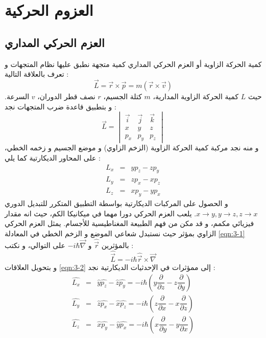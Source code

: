 \chapter{العزوم الحركية}
\label{Chapter3}
\section{العزم الحركي المداري}
كمية الحركة  الزاوية أو العزم الحركي المداري كمية متجهة نطبق عليها نظام المتجهات و تعرف بالعلاقة التالية :
\begin{equation}
	\label{eqn:3-1}
	\vec{L} = \vec{r} \times \vec{p} =m(\vec{r} \times \vec{v})
\end{equation} 
حيث $L$ كمية الحركة الزاوية المدارية، $m$ كتلة الجسيم، $r$ نصف قطر الدوران، $v$ السرعة. و بتطبيق قاعدة ضرب المتجهات نجد : 
\[\vec{L}=
\begin{vmatrix}
	\vec{i} & \vec{j} & \vec{k}\\ 
	x & y & z\\
	p_{x} & p_{y} & p_{z} 
\end{vmatrix}
\]
و منه نجد مركبة كمية الحركة الزاوية (الزخم الزاوي) و موضع الجسيم و زخمه الخطي، على المحاور الديكارتية كما يلي :
\begin{equation}
	\label{eqn:3-2}
	\begin{array}{ccl}
	L_{x} & = &  yp_{z} - zp_{y} \\
	L_{y} & = & zp_{x} - xp_{z} \\
	L_{z} & = & xp_{y} - yp_{x}
	\end{array}
\end{equation} 
و الحصول على المركبات الديكارتية بواسطة التطبيق المتكرر للتبديل الدوري $x \longrightarrow y, y \longrightarrow z, z \longrightarrow x$. يلعب العزم الحركي دورا مهما في ميكانيكا الكم، حيث انه مقدار فيزيائي مكمم، و قد مكن من فهم الطبيعة المغناطيسية للأجسام. يمثل العزم الحركي الزاوي بمؤثر  حيث نستبدل شعاعي الموضع و الزخم الخطي  في المعادلة \eqref{eqn:3-1} بالمؤثرين $\hat{\vec{r}}$  و $ -i\hbar \vec{\nabla}$ على التوالي، و نكتب :
\begin{equation}
\hat{\vec{L}}	= -i\hbar \hat{\vec{r}} \times \vec{\nabla}
\end{equation}
و بتحويل العلاقات \eqref{eqn:3-2} إلى ممؤثرات في الإحدثيات الديكارتية نجد :
 \begin{equation}
 	\label{eqn:3-4}
 	\begin{array}{ccl}
 		\hat{L_{x}} & = &  \hat{y}\hat{p_{z}} - \hat{z}\hat{p_{y}} =-i\hbar (y\dfrac{\partial}{\partial z} - z \dfrac{\partial}{\partial y}) \\
 		\hat{L_{y}} & = &  \hat{z}\hat{p_{x}} - \hat{x}\hat{p_{z}} =-i\hbar (z\dfrac{\partial}{\partial x} - x \dfrac{\partial}{\partial z}) \\
 		\hat{L_{z}} & = &  \hat{x}\hat{p_{y}} - \hat{y}\hat{p_{x}} =-i\hbar (x\dfrac{\partial}{\partial y} - y \dfrac{\partial}{\partial x})
 	\end{array}
 \end{equation} 
